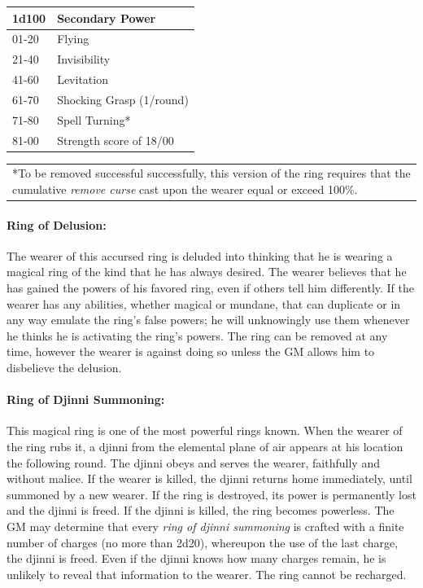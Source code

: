 \begin{multicols}{2}
\noindent
\begin{tabular}{|p{}|p{}|}
\hline
1d100	& Secondary Power\\
\hline\hline
\rowcolor[gray]{.9}01-20	& Flying\\
21-40	& Invisibility\\
\rowcolor[gray]{.9}41-60	& Levitation\\
61-70	& Shocking Grasp (1/round)\\
\rowcolor[gray]{.9}71-80	& Spell Turning*\\
81-00	& Strength score of 18/00\\
\hline
\end{tabular}
\noindent\begin{tabular}{p{}}
*To be removed successful successfully, this version of the ring requires that the cumulative \textit{remove curse} cast upon the wearer equal or exceed 100\%. \\
\end{tabular}\vspace{.5em}

\paragraph{Ring of Delusion:} The wearer of this accursed ring is deluded into thinking that he is wearing a magical ring of the kind that he has always desired.  The wearer believes that he has gained the powers of his favored ring, even if others tell him differently.  If the wearer has any abilities, whether magical or mundane, that can duplicate or in any way emulate the ring's false powers; he will unknowingly use them whenever he thinks he is activating the ring's powers.  The ring can be removed at any time, however the wearer is against doing so unless the GM allows him to disbelieve the delusion.

\paragraph{Ring of Djinni Summoning:} This magical ring is one of the most powerful rings known.  When the wearer of the ring rubs it, a djinni from the elemental plane of air appears at his location the following round.  The djinni obeys and serves the wearer, faithfully and without malice.  If the wearer is killed, the djinni returns home immediately, until summoned by a new wearer.  If the ring is destroyed, its power is permanently lost and the djinni is freed.  If the djinni is killed, the ring becomes powerless.  The GM may determine that every \textit{ring of djinni summoning} is crafted with a finite number of charges (no more than 2d20), whereupon the use of the last charge, the djinni is freed.  Even if the djinni knows how many charges remain, he is unlikely to reveal that information to the wearer.  The ring cannot be recharged.


\end{multicols}

